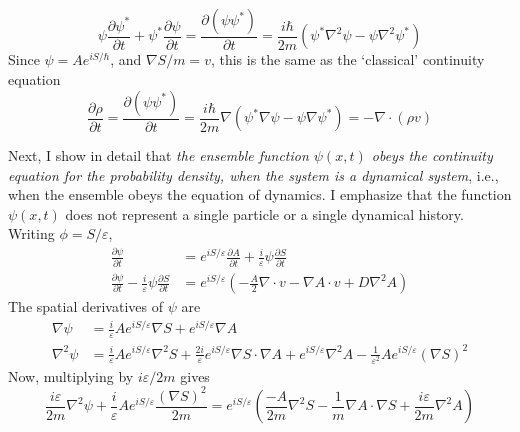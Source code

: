 \begin{equation*}
\psi\frac{\partial\psi^*}{\partial t} + \psi^*\frac{\partial\psi}{\partial t}=\frac{\partial(\psi\psi^*)}{\partial t}=
\frac{i\hbar}{2m} \left(\psi^*\nabla^2\psi-\psi\nabla^2\psi^*\right)\tag{13}\label{c14-eq13}
\end{equation*}
Since $\psi=Ae^{iS/\hbar}$, and $\nabla S/m=v$, this is the same as the `classical' continuity equation
\begin{equation*}
\frac{\partial\rho}{\partial t} = \frac{\partial(\psi\psi^*)}{\partial t}=\frac{i\hbar}{2m} \nabla (\psi^*\nabla\psi-\psi\nabla\psi^*) = -\nabla\cdot(\rho v)\tag{14}\label{c14-eq14}
\end{equation*}

Next, I show in detail that \textit{the ensemble function $\psi(x, t)$ obeys the continuity equation
for the probability density, when the system is a dynamical system}, i.e., when the ensemble
obeys the equation of dynamics. I emphasize that the function $\psi(x, t)$ does not represent a
single particle or a single dynamical history. Writing $\phi = S/\varepsilon$,
\begin{align}
\frac{\partial\psi}{\partial t} &= e^{iS/\varepsilon}\frac{\partial A}{\partial t} + \frac{i}{\varepsilon}\psi\frac{\partial S}{\partial t}\nonumber\\
\frac{\partial\psi}{\partial t}-\frac{i}{\varepsilon}\psi\frac{\partial S}{\partial t}&=e^{iS/\varepsilon}\left(-\frac{A}{2}\nabla\cdot v-\nabla A\cdot v+D\nabla^2A\right)\tag{15}\label{c14-eq15}
\end{align}
The spatial derivatives of $\psi$ are
\eject
\begin{align}
\nabla\psi &= \frac{i}{\varepsilon} Ae^{iS/\varepsilon}\nabla S + e^{iS/\varepsilon}\nabla A\nonumber\\
\nabla^2\psi &= \frac{i}{\varepsilon} Ae^{iS/\varepsilon}\nabla^2 S + \frac{2i}{\varepsilon}e^{iS/\varepsilon}\nabla S\cdot \nabla A + 
e^{iS/\varepsilon}\nabla^2 A - \frac{1}{\varepsilon^2} Ae^{iS/\varepsilon}(\nabla S)^2\tag{16}\label{c14-eq16}
\end{align}
Now, multiplying by $i\varepsilon /2m$ gives
\begin{equation*}
\frac{i\varepsilon}{2m} \nabla^2 \psi + \frac{i}{\varepsilon} A e^{iS/\varepsilon} \frac{(\nabla S)^2}{2m} = e^{iS/\varepsilon} \left(\frac{-A}{2m} \nabla^2 S - \frac{1}{m} \nabla A \cdot \nabla S + \frac{i\varepsilon}{2m} \nabla^2 A \right) \tag{17}\label{c14-eq17}
\end{equation*}


